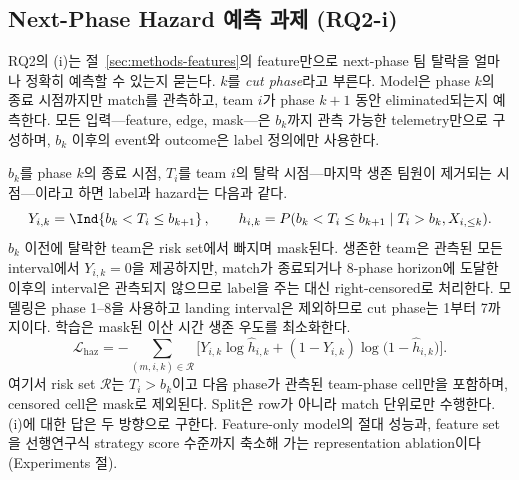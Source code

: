 \subsection{Next-Phase Hazard 예측 과제 (RQ2-i)}
\label{sec:prediction-task}

RQ2의 (i)는 절~\ref{sec:methods-features}의 feature만으로 next-phase 팀
탈락을 얼마나 정확히 예측할 수 있는지 묻는다. \(k\)를 \textit{cut phase}라고
부른다. Model은 phase \(k\)의 종료 시점까지만 match를 관측하고, team \(i\)가
phase \(k{+}1\) 동안 eliminated되는지 예측한다. 모든 입력---feature, edge,
mask---은 \(b_k\)까지 관측 가능한 telemetry만으로 구성하며, \(b_k\) 이후의
event와 outcome은 label 정의에만 사용한다.

\(b_k\)를 phase \(k\)의 종료 시점, \(T_i\)를 team \(i\)의 탈락 시점---마지막
생존 팀원이 제거되는 시점---이라고 하면 label과 hazard는 다음과 같다.
\[
Y_{i,k}=\Ind\!\left\{b_k < T_i \leq b_{k+1}\right\}, \qquad
h_{i,k}=P(b_k < T_i \leq b_{k+1}\mid T_i>b_k, X_{i,\leq k}).
\]
\(b_k\) 이전에 탈락한 team은 risk set에서 빠지며 mask된다. 생존한 team은
관측된 모든 interval에서 \(Y_{i,k}=0\)을 제공하지만, match가 종료되거나
8-phase horizon에 도달한 이후의 interval은 관측되지 않으므로 label을 주는
대신 right-censored로 처리한다. 모델링은 phase 1--8을 사용하고 landing
interval은 제외하므로 cut phase는 1부터 7까지이다. 학습은 mask된 이산 시간
생존 우도를 최소화한다.
\[
\mathcal{L}_{\mathrm{haz}}
= -\sum_{(m,i,k)\in \mathcal{R}}
\Big[ Y_{i,k}\log \hat h_{i,k} + (1-Y_{i,k})\log\big(1-\hat h_{i,k}\big) \Big].
\]
여기서 risk set \(\mathcal{R}\)는 \(T_i>b_k\)이고 다음 phase가 관측된
team-phase cell만을 포함하며, censored cell은 mask로 제외된다. Split은
row가 아니라 match 단위로만 수행한다. (i)에 대한 답은 두 방향으로 구한다.
Feature-only model의 절대 성능과, feature set을 선행연구식 strategy score
수준까지 축소해 가는 representation ablation이다(Experiments 절).
